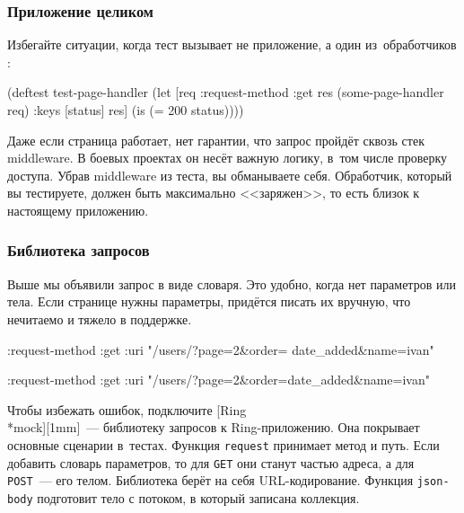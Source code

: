 \subsubsection*{Приложение целиком}

Избегайте ситуации, когда тест вызывает не приложение, а один из~обработчиков
:

\begin{english}
  \begin{clojure/lines}
(deftest test-page-handler
  (let [req {:request-method :get}
        res (some-page-handler req)
        {:keys [status]} res]
    (is (= 200 status))))
  \end{clojure/lines}
\end{english}

Даже если страница работает, нет гарантии, что запрос пройдёт сквозь стек
middleware. В боевых проектах он несёт важную логику, в~том числе проверку
доступа. Убрав middleware из теста, вы обманываете себя. Обработчик, который вы
тестируете, должен быть максимально <<заряжен>>, то есть близок к настоящему
приложению.

\subsubsection*{Библиотека запросов}

Выше мы объявили запрос в виде словаря. Это удобно, когда нет параметров или
тела. Если странице нужны параметры, придётся писать их вручную, что нечитаемо и
тяжело в поддержке.

\ifx\DEVICETYPE\MOBILE

\begin{english}
  \begin{clojure}
{:request-method :get
 :uri
 "/users/?page=2&order=
                 date_added&name=ivan"}
  \end{clojure}
\end{english}

\else

\begin{english}
  \begin{clojure}
{:request-method :get
 :uri "/users/?page=2&order=date_added&name=ivan"}
  \end{clojure}
\end{english}

\fi


Чтобы избежать ошибок, подключите
[Ring\\*mock][1mm]~--- библиотеку
запросов к Ring-при\-ло\-же\-нию. Она покрывает основные сценарии в~тестах. Функция
\verb|request| принимает метод и путь. Если добавить словарь параметров, то
для \verb|GET| они станут частью адреса, а для \verb|POST|~--- его
телом. Библиотека берёт на себя URL-кодирование. Функция \verb|json-body|
подготовит тело с потоком, в который записана коллекция.

